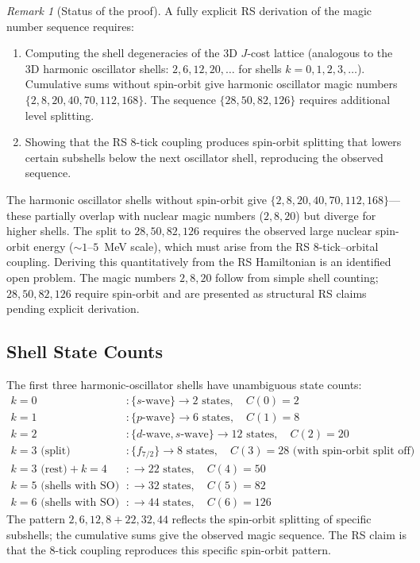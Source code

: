 \documentclass[12pt,a4paper]{article}
\theoremstyle{definition}
\theoremstyle{remark}
\newtheorem{remark}[theorem]{Remark}
\begin{document}
\begin{remark}[Status of the proof]
\label{rem:magic-status}
A fully explicit RS derivation of the magic number sequence requires:
\begin{enumerate}[label=(\roman*)]
  \item Computing the shell degeneracies of the 3D $J$-cost lattice (analogous to the 3D
  harmonic oscillator shells: $2, 6, 12, 20, \ldots$ for shells $k = 0, 1, 2, 3, \ldots$).
  Cumulative sums without spin-orbit give harmonic oscillator magic numbers $\{2, 8, 20, 40, 70, 112, 168\}$.
  The sequence $\{28, 50, 82, 126\}$ requires additional level splitting.
  \item Showing that the RS 8-tick coupling produces spin-orbit splitting that lowers certain
  subshells below the next oscillator shell, reproducing the observed sequence.
\end{enumerate}
The harmonic oscillator shells without spin-orbit give
$\{2, 8, 20, 40, 70, 112, 168\}$---these partially overlap with nuclear magic numbers
($2, 8, 20$) but diverge for higher shells.  The split to $28, 50, 82, 126$ requires
the observed large nuclear spin-orbit energy ($\sim 1$--$5$~MeV scale), which must arise
from the RS 8-tick--orbital coupling.  Deriving this quantitatively from the RS Hamiltonian
is an identified open problem.  The magic numbers $2, 8, 20$ follow from simple shell
counting; $28, 50, 82, 126$ require spin-orbit and are presented as structural RS claims
pending explicit derivation.
\end{remark}

\subsection{Shell State Counts}

The first three harmonic-oscillator shells have unambiguous state counts:
\begin{align}
k=0 &: \{s\text{-wave}\} \to 2 \text{ states},\quad C(0) = 2 \\
k=1 &: \{p\text{-wave}\} \to 6 \text{ states},\quad C(1) = 8 \\
k=2 &: \{d\text{-wave}, s\text{-wave}\} \to 12 \text{ states},\quad C(2) = 20 \\
k=3\text{ (split)} &: \{f_{7/2}\} \to 8 \text{ states},\quad C(3) = 28 \text{ (with spin-orbit split off)} \\
k=3\text{ (rest)}+k=4 &: \to 22 \text{ states},\quad C(4) = 50 \\
k=5\text{ (shells with SO)} &: \to 32 \text{ states},\quad C(5) = 82 \\
k=6\text{ (shells with SO)} &: \to 44 \text{ states},\quad C(6) = 126
\end{align}
The pattern $2, 6, 12, 8+22, 32, 44$ reflects the spin-orbit splitting of specific
subshells; the cumulative sums give the observed magic sequence.  The RS claim is that
the 8-tick coupling reproduces this specific spin-orbit pattern.
\end{document}

